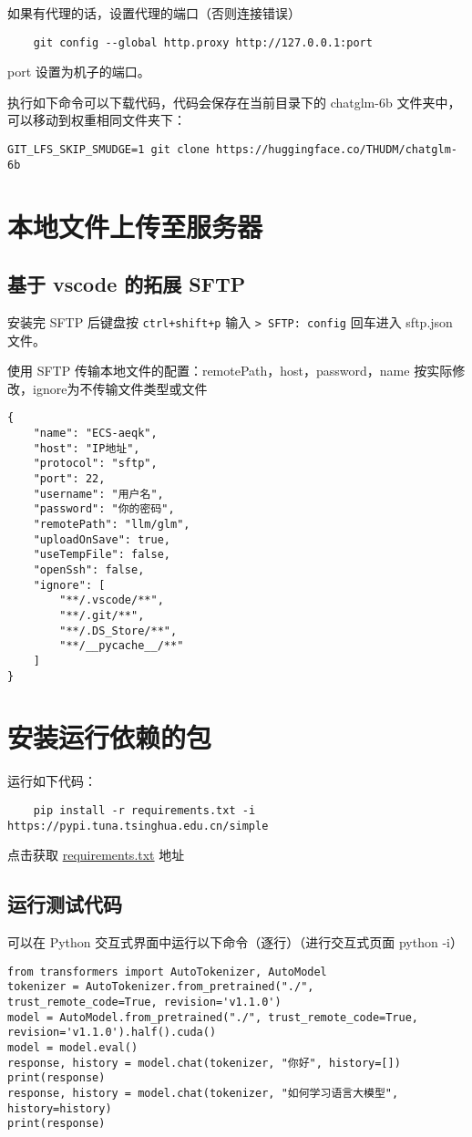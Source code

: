 \documentclass{article}
\begin{document}
如果有代理的话，设置代理的端口（否则连接错误）
\begin{verbatim}
    git config --global http.proxy http://127.0.0.1:port
\end{verbatim}
port 设置为机子的端口。

执行如下命令可以下载代码，代码会保存在当前目录下的 chatglm-6b 文件夹中，可以移动到权重相同文件夹下：

\verb|GIT_LFS_SKIP_SMUDGE=1 git clone https://huggingface.co/THUDM/chatglm-6b|

\section{本地文件上传至服务器}
\subsection{基于 vscode 的拓展 SFTP}
安装完 SFTP 后键盘按 \verb|ctrl+shift+p| 输入 \verb|> SFTP: config| 回车进入 sftp.json 文件。

使用 SFTP 传输本地文件的配置：remotePath，host，password，name 按实际修改，ignore为不传输文件类型或文件
\begin{verbatim}
{
    "name": "ECS-aeqk",
    "host": "IP地址",
    "protocol": "sftp",
    "port": 22,
    "username": "用户名",
    "password": "你的密码",
    "remotePath": "llm/glm",
    "uploadOnSave": true,
    "useTempFile": false,
    "openSsh": false,
    "ignore": [
        "**/.vscode/**",
        "**/.git/**",
        "**/.DS_Store/**",
        "**/__pycache__/**"
    ]
}
\end{verbatim}

\section{安装运行依赖的包}
运行如下代码：
\begin{verbatim}
    pip install -r requirements.txt -i https://pypi.tuna.tsinghua.edu.cn/simple
\end{verbatim}

点击获取 \href{https://github.com/THUDM/ChatGLM2-6B/blob/main/requirements.txt}{requirements.txt} 地址

\subsection{运行测试代码}

可以在 Python 交互式界面中运行以下命令（逐行）（进行交互式页面 python -i）
\begin{verbatim}
from transformers import AutoTokenizer, AutoModel
tokenizer = AutoTokenizer.from_pretrained("./", trust_remote_code=True, revision='v1.1.0')
model = AutoModel.from_pretrained("./", trust_remote_code=True, revision='v1.1.0').half().cuda()
model = model.eval()
response, history = model.chat(tokenizer, "你好", history=[])
print(response)
response, history = model.chat(tokenizer, "如何学习语言大模型", history=history)
print(response)
\end{verbatim}
\end{document}
